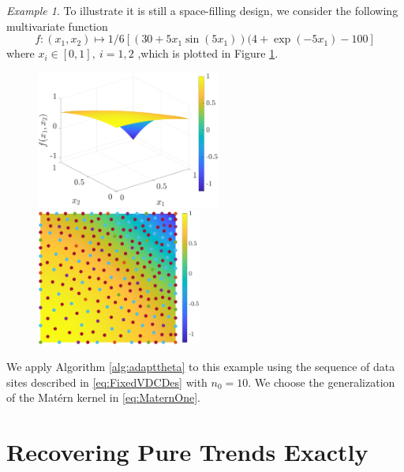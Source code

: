 \documentclass[]{mcom-l}
\theoremstyle{theorem}
\theoremstyle{remark}
\newtheorem{example}{Example}
\begin{document}
\begin{example}
\label{ex:limfun}
To illustrate it is still a space-filling design,  we consider the following multivariate function
	\begin{equation}
	f: (x_1,x_2) \mapsto 
 1/6\left[(30+5x_1\sin(5x_1))
    (4+\exp(-5x_1)-100\right] 
	\end{equation}
	where $x_i \in [0,1], \  i=1,2$ ,which is plotted in Figure \ref{fig:ChengDuFun}. 
		
	\begin{figure}[H]
		\centering
		\includegraphics[height = 4.5cm]{ProgramsImages/ChengDuFunPlot.eps} \qquad
		\includegraphics[height = 4.5cm]{ProgramsImages/Alg3_ChengDuFun_SpatialMatern_adapt_th_EmpBayes_theta_1.eps} \qquad		
		\caption{ \label{fig:ChengDuFun}}
	\end{figure}
	We apply Algorithm \ref{alg:adapttheta} to this example using the sequence of data sites described in \eqref{eq:FixedVDCDes} with $n_0=10$. We choose the generalization of the Mat\'ern kernel in \eqref{eq:MaternOne}.


		
	

\end{example}



\section{Recovering Pure Trends Exactly} \label{sec:poly}
\end{document}

